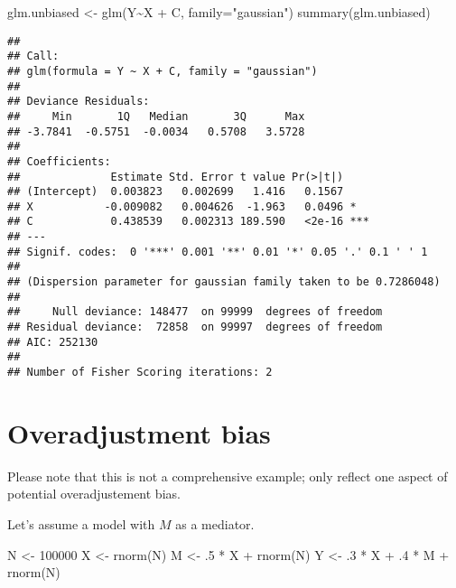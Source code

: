 \documentclass[
]{book}
\newenvironment{Shaded}{\begin{snugshade}}{\end{snugshade}}
\newcommand{\AttributeTok}[1]{\textcolor[rgb]{0.77,0.63,0.00}{#1}}
\newcommand{\DecValTok}[1]{\textcolor[rgb]{0.00,0.00,0.81}{#1}}
\newcommand{\FunctionTok}[1]{\textcolor[rgb]{0.00,0.00,0.00}{#1}}
\newcommand{\NormalTok}[1]{#1}
\newcommand{\OtherTok}[1]{\textcolor[rgb]{0.56,0.35,0.01}{#1}}
\newcommand{\SpecialCharTok}[1]{\textcolor[rgb]{0.00,0.00,0.00}{#1}}
\newcommand{\StringTok}[1]{\textcolor[rgb]{0.31,0.60,0.02}{#1}}
\begin{document}
\begin{Shaded}
\begin{Highlighting}[]
\NormalTok{glm.unbiased }\OtherTok{\textless{}{-}} \FunctionTok{glm}\NormalTok{(Y}\SpecialCharTok{\textasciitilde{}}\NormalTok{X }\SpecialCharTok{+}\NormalTok{ C, }\AttributeTok{family=}\StringTok{"gaussian"}\NormalTok{)}
\FunctionTok{summary}\NormalTok{(glm.unbiased)}
\end{Highlighting}
\end{Shaded}

\begin{verbatim}
## 
## Call:
## glm(formula = Y ~ X + C, family = "gaussian")
## 
## Deviance Residuals: 
##     Min       1Q   Median       3Q      Max  
## -3.7841  -0.5751  -0.0034   0.5708   3.5728  
## 
## Coefficients:
##              Estimate Std. Error t value Pr(>|t|)    
## (Intercept)  0.003823   0.002699   1.416   0.1567    
## X           -0.009082   0.004626  -1.963   0.0496 *  
## C            0.438539   0.002313 189.590   <2e-16 ***
## ---
## Signif. codes:  0 '***' 0.001 '**' 0.01 '*' 0.05 '.' 0.1 ' ' 1
## 
## (Dispersion parameter for gaussian family taken to be 0.7286048)
## 
##     Null deviance: 148477  on 99999  degrees of freedom
## Residual deviance:  72858  on 99997  degrees of freedom
## AIC: 252130
## 
## Number of Fisher Scoring iterations: 2
\end{verbatim}

\hypertarget{overadjustment-bias}{%
\section{Overadjustment bias}\label{overadjustment-bias}}

Please note that this is not a comprehensive example; only reflect one aspect of potential overadjustement bias.

Let's assume a model with \(M\) as a mediator.

\begin{Shaded}
\begin{Highlighting}[]
\NormalTok{N }\OtherTok{\textless{}{-}} \DecValTok{100000}
\NormalTok{X }\OtherTok{\textless{}{-}} \FunctionTok{rnorm}\NormalTok{(N)}
\NormalTok{M }\OtherTok{\textless{}{-}}\NormalTok{ .}\DecValTok{5} \SpecialCharTok{*}\NormalTok{ X }\SpecialCharTok{+} \FunctionTok{rnorm}\NormalTok{(N)}
\NormalTok{Y }\OtherTok{\textless{}{-}}\NormalTok{ .}\DecValTok{3} \SpecialCharTok{*}\NormalTok{ X }\SpecialCharTok{+}\NormalTok{ .}\DecValTok{4} \SpecialCharTok{*}\NormalTok{ M }\SpecialCharTok{+} \FunctionTok{rnorm}\NormalTok{(N)}
\end{Highlighting}
\end{Shaded}
\end{document}
